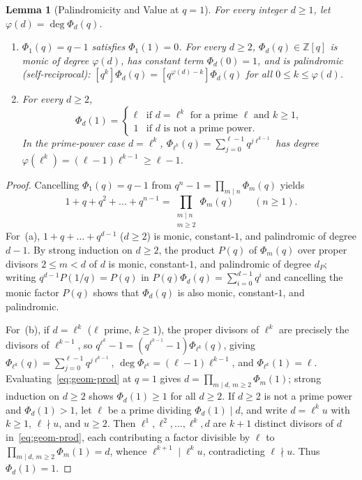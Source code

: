 \documentclass[11pt,a4paper]{article}
\newtheorem{lemma}[theorem]{Lemma}
\theoremstyle{definition}
\theoremstyle{remark}
\begin{document}
\begin{lemma}[Palindromicity and Value at $q = 1$]\label{lem:cyclotomic-basic}
For every integer $d \ge 1$, let $\varphi(d) = \deg \Phi_d(q)$.
\begin{enumerate}
  \item[(a)] $\Phi_1(q) = q - 1$ satisfies $\Phi_1(1) = 0$. For every $d \ge 2$, $\Phi_d(q) \in \mathbb{Z}[q]$ is monic of degree $\varphi(d)$, has constant term $\Phi_d(0) = 1$, and is \emph{palindromic} (self-reciprocal): $[q^k]\Phi_d(q) = [q^{\varphi(d)-k}]\Phi_d(q)$ for all $0 \le k \le \varphi(d)$.
  \item[(b)] For every $d \ge 2$,
  \[
    \Phi_d(1) = \begin{cases}
      \ell & \text{if } d = \ell^k \text{ for a prime } \ell \text{ and } k \ge 1,\\
      1 & \text{if } d \text{ is not a prime power.}
    \end{cases}
  \]
  In the prime-power case $d = \ell^k$, $\Phi_{\ell^k}(q) = \sum_{j=0}^{\ell-1} q^{j \ell^{k-1}}$ has degree $\varphi(\ell^k) = (\ell-1)\ell^{k-1} \ge \ell - 1$.
\end{enumerate}
\end{lemma}

\begin{proof}
Cancelling $\Phi_1(q) = q - 1$ from $q^n - 1 = \prod_{m \mid n} \Phi_m(q)$ yields
\begin{equation}\label{eq:geom-prod}
  1 + q + q^2 + \dots + q^{n-1} = \prod_{\substack{m \mid n \\ m \ge 2}} \Phi_m(q) \qquad (n \ge 1).
\end{equation}
For~(a), $1 + q + \dots + q^{d-1}$ ($d \ge 2$) is monic, constant-$1$, and palindromic of degree $d - 1$. By strong induction on $d \ge 2$, the product $P(q)$ of $\Phi_m(q)$ over proper divisors $2 \le m < d$ of $d$ is monic, constant-$1$, and palindromic of degree $d_P$; writing $q^{d-1} P(1/q) = P(q)$ in $P(q)\Phi_d(q) = \sum_{i=0}^{d-1} q^i$ and cancelling the monic factor $P(q)$ shows that $\Phi_d(q)$ is also monic, constant-$1$, and palindromic.

For~(b), if $d = \ell^k$ ($\ell$ prime, $k \ge 1$), the proper divisors of $\ell^k$ are precisely the divisors of $\ell^{k-1}$, so $q^{\ell^k} - 1 = (q^{\ell^{k-1}} - 1)\Phi_{\ell^k}(q)$, giving $\Phi_{\ell^k}(q) = \sum_{j=0}^{\ell-1} q^{j \ell^{k-1}}$, $\deg \Phi_{\ell^k} = (\ell-1)\ell^{k-1}$, and $\Phi_{\ell^k}(1) = \ell$. Evaluating~\eqref{eq:geom-prod} at $q = 1$ gives $d = \prod_{m \mid d,\, m \ge 2} \Phi_m(1)$; strong induction on $d \ge 2$ shows $\Phi_d(1) \ge 1$ for all $d \ge 2$. If $d \ge 2$ is not a prime power and $\Phi_d(1) > 1$, let $\ell$ be a prime dividing $\Phi_d(1) \mid d$, and write $d = \ell^k u$ with $k \ge 1$, $\ell \nmid u$, and $u \ge 2$. Then $\ell^1, \ell^2, \dots, \ell^k, d$ are $k+1$ distinct divisors of $d$ in~\eqref{eq:geom-prod}, each contributing a factor divisible by $\ell$ to $\prod_{m \mid d,\, m \ge 2} \Phi_m(1) = d$, whence $\ell^{k+1} \mid \ell^k u$, contradicting $\ell \nmid u$. Thus $\Phi_d(1) = 1$.
\end{proof}
\end{document}
